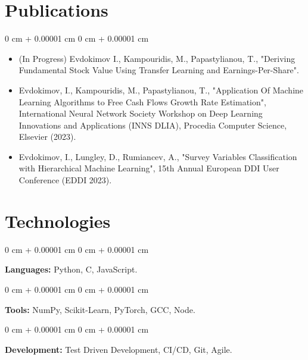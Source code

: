 \documentclass[10pt, letterpaper]{article}
\newenvironment{highlights}{
    \begin{itemize}[
        topsep=0.10 cm,
        parsep=0.10 cm,
        partopsep=0pt,
        itemsep=0pt,
        leftmargin=0 cm + 10pt
    ]
}{
    \end{itemize}
} %
\newenvironment{onecolentry}{
    \begin{adjustwidth}{
        0 cm + 0.00001 cm
    }{
        0 cm + 0.00001 cm
    }
}{
    \end{adjustwidth}
} %
\begin{document}
    \section{Publications}

    \begin{onecolentry}
        \begin{highlights}
            \item (In Progress) Evdokimov I., Kampouridis, M., Papastylianou, T., "Deriving Fundamental Stock Value Using Transfer Learning and Earnings-Per-Share".
            \item Evdokimov, I., Kampouridis, M., Papastylianou, T., "Application Of Machine Learning Algorithms to Free Cash Flows Growth Rate Estimation", International Neural Network Society Workshop on Deep Learning Innovations and Applications (INNS DLIA), Procedia Computer Science, Elsevier (2023).
            \item Evdokimov, I., Lungley, D., Rumiancev, A., "Survey Variables Classification with Hierarchical Machine Learning", 15th Annual European DDI User Conference (EDDI 2023).
        \end{highlights}
    \end{onecolentry}

    \section{Technologies}
        
        \begin{onecolentry}
            \textbf{Languages:} Python, C, JavaScript.
        \end{onecolentry}

        \vspace{0.2 cm}

        \begin{onecolentry}
            \textbf{Tools:} NumPy, Scikit-Learn, PyTorch, GCC, Node.
        \end{onecolentry}

        \vspace{0.2 cm}

        \begin{onecolentry}
            \textbf{Development:} Test Driven Development, CI/CD, Git, Agile.
        \end{onecolentry}
    
\end{document}
